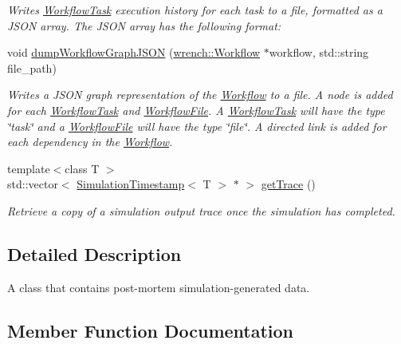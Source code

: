 \begin{DoxyCompactItemize}
\begin{DoxyCompactList}\small\item\em Writes \hyperlink{classwrench_1_1_workflow_task}{Workflow\+Task} execution history for each task to a file, formatted as a J\+S\+ON array.  The J\+S\+ON array has the following format\+: \end{DoxyCompactList}\item 
void \hyperlink{classwrench_1_1_simulation_output_aeb5ce1ef8b84cda7b0df5f21532088b2}{dump\+Workflow\+Graph\+J\+S\+ON} (\hyperlink{classwrench_1_1_workflow}{wrench\+::\+Workflow} $\ast$workflow, std\+::string file\+\_\+path)
\begin{DoxyCompactList}\small\item\em Writes a J\+S\+ON graph representation of the \hyperlink{classwrench_1_1_workflow}{Workflow} to a file.  A node is added for each \hyperlink{classwrench_1_1_workflow_task}{Workflow\+Task} and \hyperlink{classwrench_1_1_workflow_file}{Workflow\+File}. A \hyperlink{classwrench_1_1_workflow_task}{Workflow\+Task} will have the type \char`\"{}task\char`\"{} and a \hyperlink{classwrench_1_1_workflow_file}{Workflow\+File} will have the type \char`\"{}file\char`\"{}. A directed link is added for each dependency in the \hyperlink{classwrench_1_1_workflow}{Workflow}. \end{DoxyCompactList}\item 
{\footnotesize template$<$class T $>$ }\\std\+::vector$<$ \hyperlink{classwrench_1_1_simulation_timestamp}{Simulation\+Timestamp}$<$ T $>$ $\ast$ $>$ \hyperlink{classwrench_1_1_simulation_output_a1d03324f34db985d0e181e42cf30cd9d}{get\+Trace} ()
\begin{DoxyCompactList}\small\item\em Retrieve a copy of a simulation output trace once the simulation has completed. \end{DoxyCompactList}\end{DoxyCompactItemize}


\subsection{Detailed Description}
A class that contains post-\/mortem simulation-\/generated data. 

\subsection{Member Function Documentation}
\mbox{\label{classwrench_1_1_simulation_output_ae5d690148a4ca7ac204c826e2acfc7c9}} 
